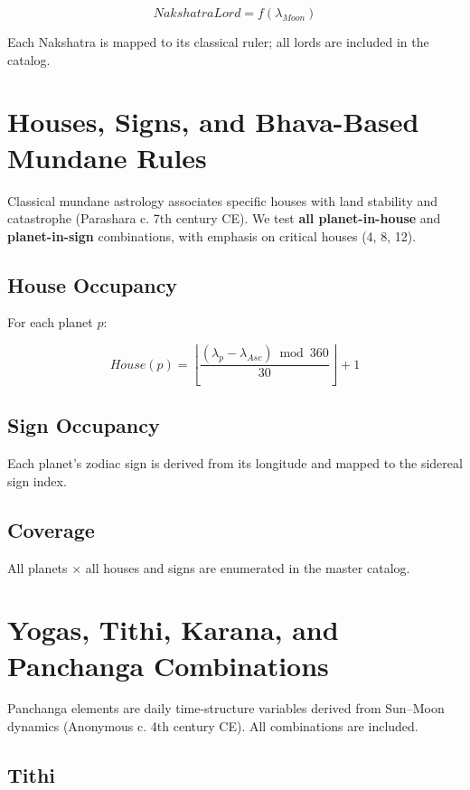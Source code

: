 \documentclass[
  11pt,
  a4paper,
  oneside,
  openany]{article}
\begin{document}
\[
NakshatraLord = f(\lambda_{Moon})
\]

Each Nakshatra is mapped to its classical ruler; all lords are included
in the catalog.

\section{Houses, Signs, and Bhava-Based Mundane
Rules}\label{houses-signs-and-bhava-based-mundane-rules}

Classical mundane astrology associates specific houses with land
stability and catastrophe (Parashara c. 7th century CE). We test
\textbf{all planet-in-house} and \textbf{planet-in-sign} combinations,
with emphasis on critical houses (4, 8, 12).

\subsection{House Occupancy}\label{house-occupancy}

For each planet \(p\):

\[
House(p) = \left\lfloor \frac{(\lambda_p - \lambda_{Asc}) \bmod 360}{30} \right\rfloor + 1
\]

\subsection{Sign Occupancy}\label{sign-occupancy}

Each planet's zodiac sign is derived from its longitude and mapped to
the sidereal sign index.

\subsection{Coverage}\label{coverage}

All planets × all houses and signs are enumerated in the master catalog.

\section{Yogas, Tithi, Karana, and Panchanga
Combinations}\label{yogas-tithi-karana-and-panchanga-combinations}

Panchanga elements are daily time-structure variables derived from
Sun--Moon dynamics (Anonymous c. 4th century CE). All combinations are
included.

\subsection{Tithi}\label{tithi}
\end{document}
